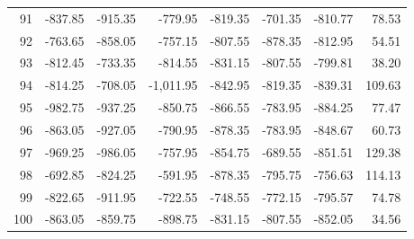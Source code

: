 \begin{longtable}{rrrrrrrr}
91 & -837.85 & -915.35 & -779.95 & -819.35 & -701.35 & -810.77 & 78.53  \\
92 & -763.65 & -858.05 & -757.15 & -807.55 & -878.35 & -812.95 & 54.51  \\
93 & -812.45 & -733.35 & -814.55 & -831.15 & -807.55 & -799.81 & 38.20  \\
94 & -814.25 & -708.05 & -1,011.95 & -842.95 & -819.35 & -839.31 & 109.63  \\
95 & -982.75 & -937.25 & -850.75 & -866.55 & -783.95 & -884.25 & 77.47  \\
96 & -863.05 & -927.05 & -790.95 & -878.35 & -783.95 & -848.67 & 60.73  \\
97 & -969.25 & -986.05 & -757.95 & -854.75 & -689.55 & -851.51 & 129.38  \\
98 & -692.85 & -824.25 & -591.95 & -878.35 & -795.75 & -756.63 & 114.13  \\
99 & -822.65 & -911.95 & -722.55 & -748.55 & -772.15 & -795.57 & 74.78  \\
100 & -863.05 & -859.75 & -898.75 & -831.15 & -807.55 & -852.05 & 34.56  \\

\end{longtable}


